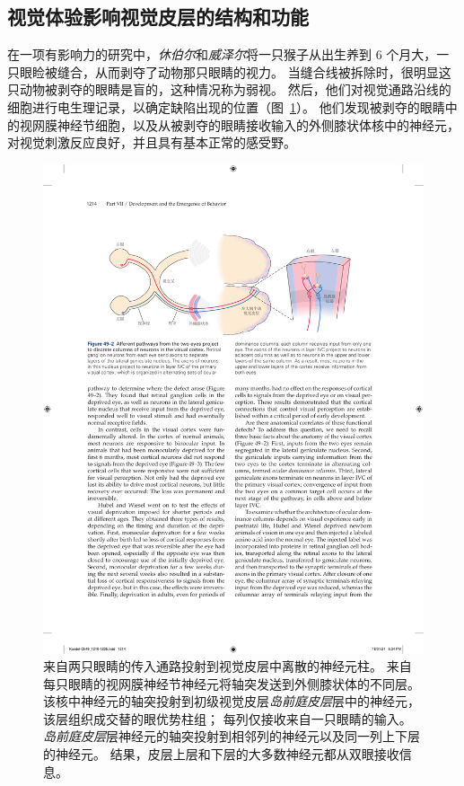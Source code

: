 \subsection{视觉体验影响视觉皮层的结构和功能}

在一项有影响力的研究中，\textit{休伯尔}和\textit{威泽尔}将一只猴子从出生养到 6 个月大，一只眼睑被缝合，从而剥夺了动物那只眼睛的视力。
当缝合线被拆除时，很明显这只动物被剥夺的眼睛是盲的，这种情况称为弱视。
然后，他们对视觉通路沿线的细胞进行电生理记录，以确定缺陷出现的位置（图~\ref{fig:49_2}）。
他们发现被剥夺的眼睛中的视网膜神经节细胞，以及从被剥夺的眼睛接收输入的外侧膝状体核中的神经元，对视觉刺激反应良好，并且具有基本正常的感受野。


\begin{figure}[htbp]
	\centering
	\includegraphics[width=1.0\linewidth]{chap49/fig_49_2}
	\caption{来自两只眼睛的传入通路投射到视觉皮层中离散的神经元柱。
		来自每只眼睛的视网膜神经节神经元将轴突发送到外侧膝状体的不同层。
		该核中神经元的轴突投射到初级视觉皮层\textit{岛前庭皮层}层中的神经元，该层组织成交替的眼优势柱组；
		每列仅接收来自一只眼睛的输入。
		\textit{岛前庭皮层}层神经元的轴突投射到相邻列的神经元以及同一列上下层的神经元。
		结果，皮层上层和下层的大多数神经元都从双眼接收信息。}
	\label{fig:49_2}
\end{figure}


